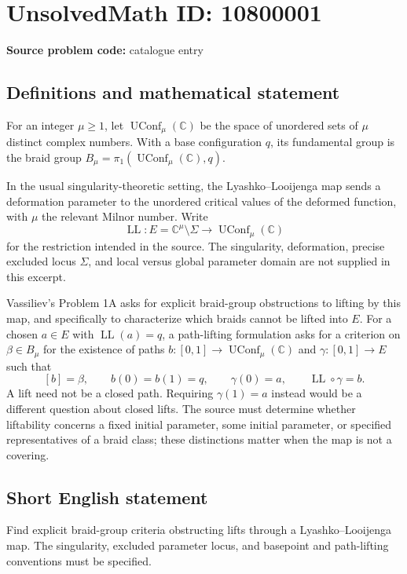 \documentclass[11pt]{article}
\newcommand{\C}{\mathbb{C}}
\begin{document}
\section*{UnsolvedMath ID: 10800001}
\textbf{Source problem code:} catalogue entry
\subsection{Definitions and mathematical statement}
For an integer $\mu\geq1$, let $\operatorname{UConf}_{\mu}(\C)$ be the space of unordered sets of $\mu$ distinct complex numbers. With a base configuration $q$, its fundamental group is the braid group $B_\mu=\pi_1(\operatorname{UConf}_{\mu}(\C),q)$.

In the usual singularity-theoretic setting, the Lyashko--Looijenga map sends a deformation parameter to the unordered critical values of the deformed function, with $\mu$ the relevant Milnor number. Write
\[
 \operatorname{LL}:E=\C^\mu\setminus\Sigma
 \longrightarrow \operatorname{UConf}_{\mu}(\C)
\]
for the restriction intended in the source. The singularity, deformation, precise excluded locus $\Sigma$, and local versus global parameter domain are not supplied in this excerpt.

Vassiliev's Problem 1A asks for explicit braid-group obstructions to lifting by this map, and specifically to characterize which braids cannot be lifted into $E$. For a chosen $a\in E$ with $\operatorname{LL}(a)=q$, a path-lifting formulation asks for a criterion on $\beta\in B_\mu$ for the existence of paths $b:[0,1]\to\operatorname{UConf}_{\mu}(\C)$ and $\gamma:[0,1]\to E$ such that
\[
 [b]=\beta,\qquad b(0)=b(1)=q,\qquad
 \gamma(0)=a,\qquad \operatorname{LL}\circ\gamma=b.
\]
A lift need not be a closed path. Requiring $\gamma(1)=a$ instead would be a different question about closed lifts. The source must determine whether liftability concerns a fixed initial parameter, some initial parameter, or specified representatives of a braid class; these distinctions matter when the map is not a covering.
\subsection{Short English statement}
Find explicit braid-group criteria obstructing lifts through a Lyashko--Looijenga map. The singularity, excluded parameter locus, and basepoint and path-lifting conventions must be specified.
\end{document}
